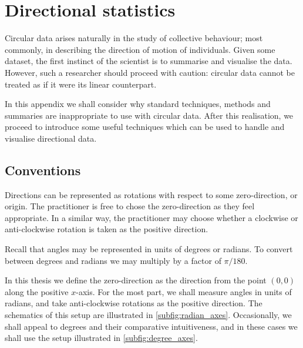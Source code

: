 \graphicspath{{fig/circ_stats_intro/}}

\chapter{Directional statistics}	
\label{cha:direct_stats}


Circular data arises naturally in the study of collective behaviour; most commonly, in
describing the direction of motion of individuals. Given some dataset, the first
instinct of the scientist is to summarise and visualise the data. However, such a
researcher should proceed with caution: circular data cannot be treated as if it were
its linear counterpart.

In this appendix we shall consider why standard techniques, methods and summaries are
inappropriate to use with circular data. After this realisation, we proceed to introduce
some useful techniques which can be used to handle and visualise directional data.

\section{Conventions}
\label{sec:conventions}

Directions can be represented as rotations with respect to some zero-direction, or
origin. The practitioner is free to chose the zero-direction as they feel appropriate. In
a similar way, the practitioner may choose whether a clockwise or anti-clockwise rotation
is taken as the positive direction.

Recall that angles may be represented in units of degrees or radians. To convert between
degrees and radians we may multiply by a factor of $\pi/180$\textdegree.

In this thesis we define the zero-direction as the direction from the point $(0, 0)$ along
the positive $x$-axis. For the most part, we shall measure angles in units of radians, and
take anti-clockwise rotations as the positive direction. The schematics of this setup are
illustrated in \cref{subfig:radian_axes}. Occasionally, we shall appeal to degrees and
their comparative intuitiveness, and in these cases we shall use the setup illustrated in
\cref{subfig:degree_axes}.

